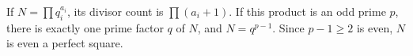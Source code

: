 If $N=\prod q_i^{a_i}$, its divisor count is $\prod(a_i+1)$. If this product is an odd prime $p$, there is exactly one prime factor $q$ of $N$, and $N=q^{p-1}$. Since $p-1\ge2$ is even, $N$ is even a perfect square.
